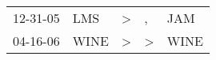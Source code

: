 \begin{supertabular}{lllll}
 12-31-05 &   LMS &  \textgreater &             , &   JAM \\
 04-16-06 &  WINE &  \textgreater &  \textgreater &  WINE \\
\end{supertabular}

